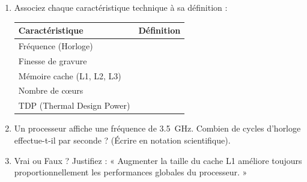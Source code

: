 \documentclass[11pt]{article}
\begin{document}
\begin{exercice}
\begin{enumerate}
    \item Associez chaque caractéristique technique à sa définition :
    \begin{tabular}{|p{4cm}|p{11cm}|}
    \hline
    \textbf{Caractéristique} & \textbf{Définition} \\
    \hline
    Fréquence (Horloge) & \underline{\hspace{11cm}} \\
    \hline
    Finesse de gravure & \underline{\hspace{11cm}} \\
    \hline
    Mémoire cache (L1, L2, L3) & \underline{\hspace{11cm}} \\
    \hline
    Nombre de cœurs & \underline{\hspace{11cm}} \\
    \hline
    TDP (Thermal Design Power) & \underline{\hspace{11cm}} \\
    \hline
    \end{tabular}
    \item Un processeur affiche une fréquence de \SI{3.5}{GHz}. Combien de cycles d'horloge effectue-t-il par seconde ? (Écrire en notation scientifique).
    \item Vrai ou Faux ? Justifiez : « Augmenter la taille du cache L1 améliore toujours proportionnellement les performances globales du processeur. »
\end{enumerate}
\end{exercice}
\end{document}
